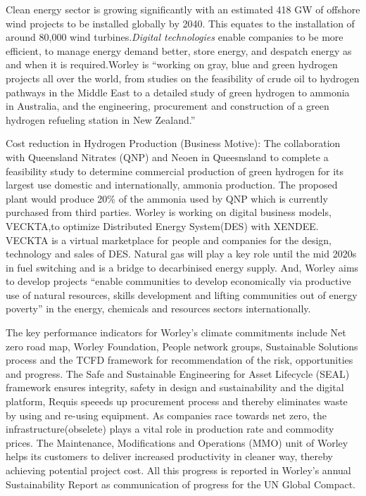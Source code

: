 \documentclass[11pt,a4paper,]{article}
\begin{document}
Clean energy sector is growing significantly with an estimated 418 GW of offshore wind projects to be installed globally by 2040. This equates to the installation of around 80,000 wind turbines.\emph{Digital technologies} enable companies to be more efficient, to manage energy demand better, store energy, and despatch energy as and when it is required.Worley is ``working on gray, blue and green hydrogen projects all over the world, from studies on the feasibility of crude oil to hydrogen pathways in the Middle East to a detailed study of green hydrogen to ammonia in Australia, and the engineering, procurement and construction of a green hydrogen refueling station in New Zealand.''

Cost reduction in Hydrogen Production (Business Motive): The collaboration with Queensland Nitrates (QNP) and Neoen in Queesnsland to complete a feasibility study to determine commercial production of green hydrogen for its largest use domestic and internationally, ammonia production. The proposed plant would produce 20\% of the ammonia used by QNP which is currently purchased from third parties. Worley is working on digital business models, VECKTA,to optimize Distributed Energy System(DES) with XENDEE. VECKTA is a virtual marketplace for people and companies for the design, technology and sales of DES. Natural gas will play a key role until the mid 2020s in fuel switching and is a bridge to decarbinised energy supply. And, Worley aims to develop projects ``enable communities to develop economically via productive use of natural resources, skills development and lifting communities out of energy poverty'' in the energy, chemicals and resources sectors internationally.

The key performance indicators for Worley's climate commitments include Net zero road map, Worley Foundation, People network groups, Sustainable Solutions process and the TCFD framework for recommendation of the risk, opportunities and progress. The Safe and Sustainable Engineering for Asset Lifecycle (SEAL) framework ensures integrity, safety in design and sustainability and the digital platform, Requis speeeds up procurement process and thereby eliminates waste by using and re-using equipment. As companies race towards net zero, the infrastructure(obselete) plays a vital role in production rate and commodity prices. The Maintenance, Modifications and Operations (MMO) unit of Worley helps its customers to deliver increased productivity in cleaner way, thereby achieving potential project cost. All this progress is reported in Worley's annual Sustainability Report as communication of progress for the UN Global Compact.
\end{document}
